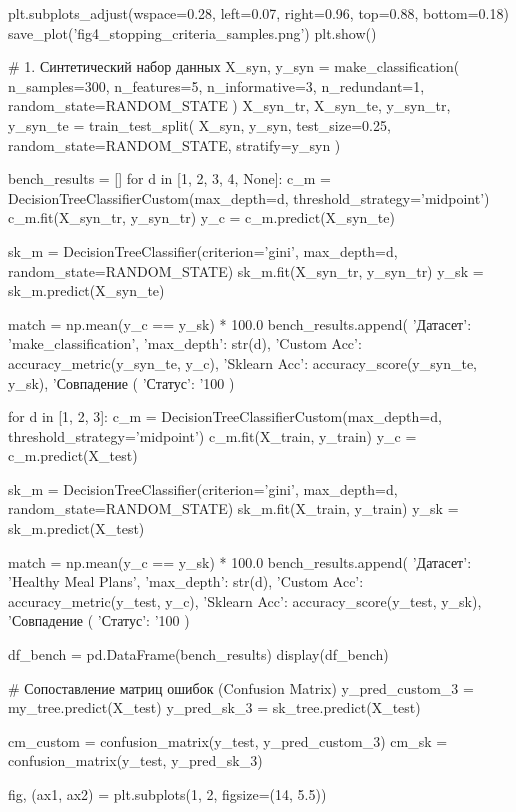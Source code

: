 \documentclass[14pt,a4paper]{extarticle}
\begin{document}
\begin{CodeListing}
plt.subplots_adjust(wspace=0.28, left=0.07, right=0.96, top=0.88, bottom=0.18)
save_plot('fig4_stopping_criteria_samples.png')
plt.show()

# 1. Синтетический набор данных
X_syn, y_syn = make_classification(
    n_samples=300, n_features=5, n_informative=3, n_redundant=1, random_state=RANDOM_STATE
)
X_syn_tr, X_syn_te, y_syn_tr, y_syn_te = train_test_split(
    X_syn, y_syn, test_size=0.25, random_state=RANDOM_STATE, stratify=y_syn
)

bench_results = []
for d in [1, 2, 3, 4, None]:
    c_m = DecisionTreeClassifierCustom(max_depth=d, threshold_strategy='midpoint')
    c_m.fit(X_syn_tr, y_syn_tr)
    y_c = c_m.predict(X_syn_te)

    sk_m = DecisionTreeClassifier(criterion='gini', max_depth=d, random_state=RANDOM_STATE)
    sk_m.fit(X_syn_tr, y_syn_tr)
    y_sk = sk_m.predict(X_syn_te)

    match = np.mean(y_c == y_sk) * 100.0
    bench_results.append({
        'Датасет': 'make_classification',
        'max_depth': str(d),
        'Custom Acc': accuracy_metric(y_syn_te, y_c),
        'Sklearn Acc': accuracy_score(y_syn_te, y_sk),
        'Совпадение (%
        'Статус': '100%
    })

for d in [1, 2, 3]:
    c_m = DecisionTreeClassifierCustom(max_depth=d, threshold_strategy='midpoint')
    c_m.fit(X_train, y_train)
    y_c = c_m.predict(X_test)

    sk_m = DecisionTreeClassifier(criterion='gini', max_depth=d, random_state=RANDOM_STATE)
    sk_m.fit(X_train, y_train)
    y_sk = sk_m.predict(X_test)

    match = np.mean(y_c == y_sk) * 100.0
    bench_results.append({
        'Датасет': 'Healthy Meal Plans',
        'max_depth': str(d),
        'Custom Acc': accuracy_metric(y_test, y_c),
        'Sklearn Acc': accuracy_score(y_test, y_sk),
        'Совпадение (%
        'Статус': '100%
    })

df_bench = pd.DataFrame(bench_results)
display(df_bench)

# Сопоставление матриц ошибок (Confusion Matrix)
y_pred_custom_3 = my_tree.predict(X_test)
y_pred_sk_3 = sk_tree.predict(X_test)

cm_custom = confusion_matrix(y_test, y_pred_custom_3)
cm_sk = confusion_matrix(y_test, y_pred_sk_3)

fig, (ax1, ax2) = plt.subplots(1, 2, figsize=(14, 5.5))


\end{CodeListing}
\end{document}
